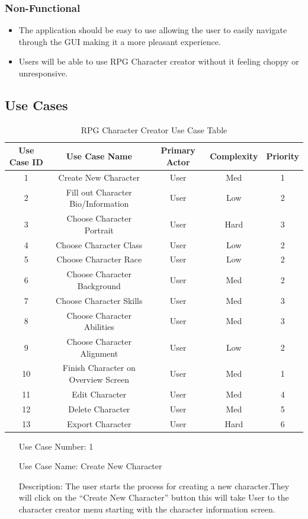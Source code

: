 \documentclass[10pt,conference,onecolumn,compsoc]{IEEEtran}
\begin{document}
\subsubsection{Non-Functional}
\begin{itemize}
\item The application should be easy to use allowing the user to easily navigate through the GUI making it a more pleasant experience.
\item Users will be able to use RPG Character creator without it feeling choppy or unresponsive.
\end{itemize}

\subsection{Use Cases}
\begin{table}
\centering
\begin{tabular}{|c|c|c|c|c|}
\hline
Use Case ID & Use Case Name & Primary Actor & Complexity & Priority \\
\hline \hline
1 &  Create New Character & User & Med & 1\\
\hline
2 & Fill out Character Bio/Information & User & Low & 2\\
\hline
3 & Choose Character Portrait & User & Hard & 3\\
\hline
4 & Choose Character Class & User & Low & 2\\
\hline
5 & Choose Character Race & User & Low & 2\\
\hline
6 & Choose Character Background & User & Med & 2\\
\hline
7 & Choose Character Skills & User & Med & 3\\
\hline
8 & Choose Character Abilities & User & Med & 3\\
\hline
9 & Choose Character Alignment & User & Low & 2\\
\hline
10 & Finish Character on Overview Screen & User & Med & 1\\
\hline
11 & Edit Character & User & Med & 4\\
\hline
12 & Delete Character & User & Med & 5\\
\hline
13 & Export Character & User & Hard & 6\\
\hline

\end{tabular}
\caption{RPG Character Creator Use Case Table}
\label{tab:useCaseIndex}
\end{table}


\begin{itemize}
\item[Use Case Number:] 1
\item[Use Case Name:] Create New Character
\item[Description:] The user starts the process for creating a new character.They will click on the “Create New Character” button this will take User to the character creator menu starting with the character information screen. 
\end{itemize}
\end{document}
